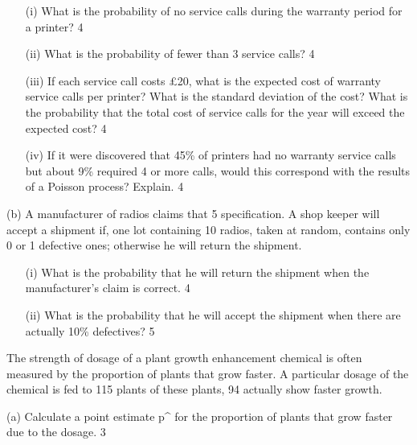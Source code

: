\begin{itemize} 
\item[(i)] What is the probability of no service calls during the warranty period for a printer?                                                                                                            4 
 
\item[(ii)] What is the probability of fewer than 3 service calls? 			4 
 
\item[(iii)] If each service call costs £20, what is the expected cost of warranty service calls per  printer? What is the standard deviation of the cost? What is the probability that the  total cost of service calls for the year will exceed the expected cost? 											4 
 
 
\item[(iv)] If it were discovered that 45\% of printers had no warranty service calls but about 9\%   required 4 or more calls, would this correspond with the results of a Poisson process?  Explain. 								4 
\end{itemize}
 
(b) A manufacturer of radios claims that 5%
  specification. A shop keeper will accept a shipment if, one lot containing 10 radios, taken at random, contains only 0 or 1 defective ones; otherwise he will return the shipment. 
 
\begin{itemize} 
\item[(i)] What is the probability that he will return the shipment when the  manufacturer's claim  is correct. 						4  

\item[(ii)] What is the probability that he will accept the shipment when there are actually 10\%  defectives? 							5 
\end{itemize}

The strength of dosage of a plant growth enhancement chemical is often measured by the proportion of plants that grow faster. A particular dosage of the chemical is fed to 115 plants of these plants, 94 actually show faster growth. 
                                                          
(a) Calculate a point estimate p^ for the proportion of plants that grow faster due to the  dosage. 									3 
 
